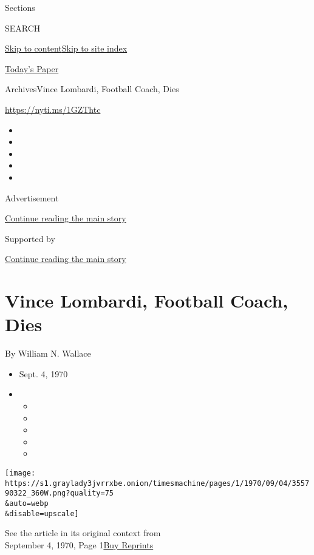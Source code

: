 Sections

SEARCH

\protect\hyperlink{site-content}{Skip to
content}\protect\hyperlink{site-index}{Skip to site index}

\href{https://myaccount.nytimes3xbfgragh.onion/auth/login?response_type=cookie\&client_id=vi}{}

\href{https://www.nytimes3xbfgragh.onion/section/todayspaper}{Today's
Paper}

Archives\textbar{}Vince Lombardi, Football Coach, Dies

\url{https://nyti.ms/1GZThtc}

\begin{itemize}
\item
\item
\item
\item
\item
\end{itemize}

Advertisement

\protect\hyperlink{after-top}{Continue reading the main story}

Supported by

\protect\hyperlink{after-sponsor}{Continue reading the main story}

\hypertarget{vince-lombardi-football-coach-dies}{%
\section{Vince Lombardi, Football Coach,
Dies}\label{vince-lombardi-football-coach-dies}}

By William N. Wallace

\begin{itemize}
\item
  Sept. 4, 1970
\item
  \begin{itemize}
  \item
  \item
  \item
  \item
  \item
  \end{itemize}
\end{itemize}

\texttt{[image: https://s1.graylady3jvrrxbe.onion/timesmachine/pages/1/1970/09/04/355790322\_360W.png?quality=75\\\&auto=webp\\\&disable=upscale]}

See the article in its original context from\\
September 4, 1970, Page
1\href{https://store.nytimes3xbfgragh.onion/collections/new-york-times-page-reprints?utm_source=nytimes\&utm_medium=article-page\&utm_campaign=reprints}{Buy
Reprints}

